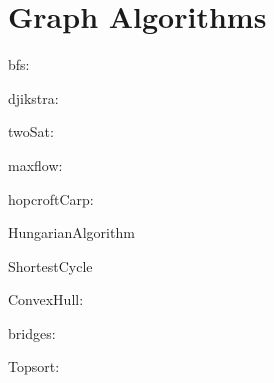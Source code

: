 \chapter{Graph Algorithms}

bfs:


djikstra:


twoSat:


maxflow:


hopcroftCarp:


HungarianAlgorithm


ShortestCycle


ConvexHull:


bridges:


Topsort:




